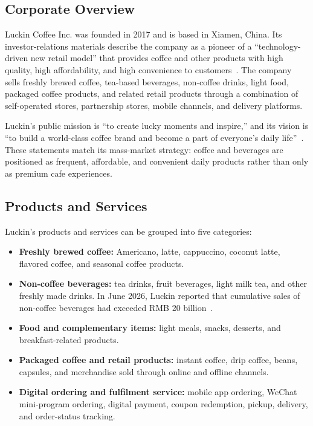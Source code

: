 \documentclass[12pt,a4paper]{article}
\begin{document}
\subsection{Corporate Overview}

Luckin Coffee Inc. was founded in 2017 and is based in Xiamen, China. Its investor-relations materials describe the company as a pioneer of a ``technology-driven new retail model'' that provides coffee and other products with high quality, high affordability, and high convenience to customers~\cite{luckin_ir_overview}. The company sells freshly brewed coffee, tea-based beverages, non-coffee drinks, light food, packaged coffee products, and related retail products through a combination of self-operated stores, partnership stores, mobile channels, and delivery platforms.

Luckin's public mission is ``to create lucky moments and inspire,'' and its vision is ``to build a world-class coffee brand and become a part of everyone's daily life''~\cite{luckin_ir_overview}. These statements match its mass-market strategy: coffee and beverages are positioned as frequent, affordable, and convenient daily products rather than only as premium cafe experiences.

\subsection{Products and Services}

Luckin's products and services can be grouped into five categories:

\begin{itemize}[leftmargin=1.3em]
  \item \textbf{Freshly brewed coffee:} Americano, latte, cappuccino, coconut latte, flavored coffee, and seasonal coffee products.
  \item \textbf{Non-coffee beverages:} tea drinks, fruit beverages, light milk tea, and other freshly made drinks. In June 2026, Luckin reported that cumulative sales of non-coffee beverages had exceeded RMB 20 billion~\cite{luckin_noncoffee_2026}.
  \item \textbf{Food and complementary items:} light meals, snacks, desserts, and breakfast-related products.
  \item \textbf{Packaged coffee and retail products:} instant coffee, drip coffee, beans, capsules, and merchandise sold through online and offline channels.
  \item \textbf{Digital ordering and fulfilment service:} mobile app ordering, WeChat mini-program ordering, digital payment, coupon redemption, pickup, delivery, and order-status tracking.
\end{itemize}
\end{document}
